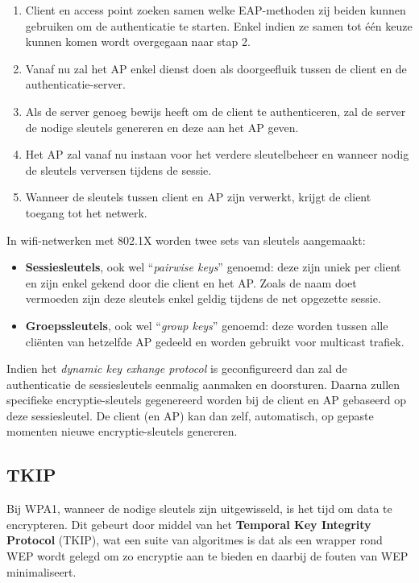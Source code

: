 \documentclass[
  10pt,
  dutch,
  paper=a4,
  ,captions=tableheading
]{scrbook}
\providecommand{\tightlist}{%
  \setlength{\itemsep}{0pt}\setlength{\parskip}{0pt}}
\begin{document}
\begin{enumerate}
\def\labelenumi{\arabic{enumi}.}
\tightlist
\item
  Client en access point zoeken samen welke EAP-methoden zij beiden
  kunnen gebruiken om de authenticatie te starten. Enkel indien ze samen
  tot één keuze kunnen komen wordt overgegaan naar stap 2.
\item
  Vanaf nu zal het AP enkel dienst doen als doorgeefluik tussen de
  client en de authenticatie-server.
\item
  Als de server genoeg bewijs heeft om de client te authenticeren, zal
  de server de nodige sleutels genereren en deze aan het AP geven.
\item
  Het AP zal vanaf nu instaan voor het verdere sleutelbeheer en wanneer
  nodig de sleutels verversen tijdens de sessie.
\item
  Wanneer de sleutels tussen client en AP zijn verwerkt, krijgt de
  client toegang tot het netwerk.
\end{enumerate}

In wifi-netwerken met 802.1X worden twee sets van sleutels aangemaakt:

\begin{itemize}
\tightlist
\item
  \textbf{Sessiesleutels}, ook wel ``\emph{pairwise keys}'' genoemd:
  deze zijn uniek per client en zijn enkel gekend door die client en het
  AP. Zoals de naam doet vermoeden zijn deze sleutels enkel geldig
  tijdens de net opgezette sessie.
\item
  \textbf{Groepssleutels}, ook wel ``\emph{group keys}'' genoemd: deze
  worden tussen alle cliënten van hetzelfde AP gedeeld en worden
  gebruikt voor multicast trafiek.
\end{itemize}

Indien het \emph{dynamic key exhange protocol} is geconfigureerd dan zal
de authenticatie de sessiesleutels eenmalig aanmaken en doorsturen.
Daarna zullen specifieke encryptie-sleutels gegenereerd worden bij de
client en AP gebaseerd op deze sessiesleutel. De client (en AP) kan dan
zelf, automatisch, op gepaste momenten nieuwe encryptie-sleutels
genereren.

\subsection{TKIP}\label{tkip}

Bij WPA1, wanneer de nodige sleutels zijn uitgewisseld, is het tijd om
data te encrypteren. Dit gebeurt door middel van het \textbf{Temporal
Key Integrity Protocol} (TKIP), wat een suite van algoritmes is dat als
een wrapper rond WEP wordt gelegd om zo encryptie aan te bieden en
daarbij de fouten van WEP minimaliseert.
\end{document}
